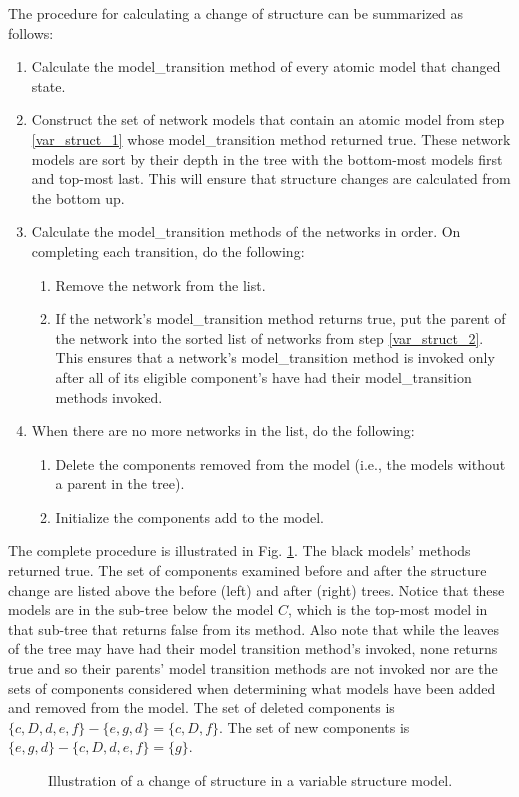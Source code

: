 The procedure for calculating a change of structure can be summarized as follows:
\begin{enumerate}
\item Calculate the model\_transition method of every atomic model that changed state.\label{var_struct_1}
\item Construct the set of network models that contain an atomic model from step \ref{var_struct_1} whose model\_transition method returned true. These network models are sort by their depth in the tree with the bottom-most models first and top-most last. This will ensure that structure changes are calculated from the bottom up. \label{var_struct_2}
\item Calculate the model\_transition methods of the networks in order. On completing each transition, do the following:
\begin{enumerate}
\item Remove the network from the list.
\item If the network's model\_transition method returns true, put the parent of the network into the sorted list of networks from step \ref{var_struct_2}. This ensures that a network's model\_transition method is invoked only after all of its eligible component's have had their model\_transition methods invoked.
\end{enumerate}
\item When there are no more networks in the list, do the following:
\begin{enumerate}
\item Delete the components removed from the model (i.e., the models without a parent in the tree).
\item Initialize the components add to the model.
\end{enumerate}
\end{enumerate}

The complete procedure is illustrated in Fig. \ref{fig:set_defns}. The black models'  methods returned true. The set of components examined before and after the structure change are listed above the before (left) and after (right) trees. Notice that these models are in the sub-tree below the model $C$, which is the top-most model in that sub-tree that returns false from its  method. Also note that while the leaves of the tree may have had their model transition method's invoked, none returns true and so their parents' model transition methods are not invoked nor are the sets of components considered when determining what models have been added and removed from the model. The set of deleted components is $\{c,D,d,e,f\}-\{e,g,d\} = \{c,D,f\}$. The set of new components is $\{e,g,d\} - \{c,D,d,e,f\} = \{g\}$.
\begin{figure}[ht]
\centering
{}
\caption{Illustration of a change of structure in a variable structure model.}
\label{fig:set_defns}
\end{figure}

